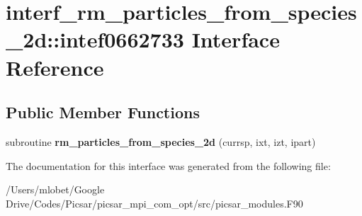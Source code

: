 \hypertarget{interfaceinterf__rm__particles__from__species__2d_1_1intef0662733}{}\section{interf\+\_\+rm\+\_\+particles\+\_\+from\+\_\+species\+\_\+2d\+:\+:intef0662733 Interface Reference}
\label{interfaceinterf__rm__particles__from__species__2d_1_1intef0662733}
\subsection*{Public Member Functions}
\begin{DoxyCompactItemize}
\item 
subroutine {\bfseries rm\+\_\+particles\+\_\+from\+\_\+species\+\_\+2d} (currsp, ixt, izt, ipart)\hypertarget{interfaceinterf__rm__particles__from__species__2d_1_1intef0662733_a2238c25c823ff2c8c90c3ff171bee287}{}\label{interfaceinterf__rm__particles__from__species__2d_1_1intef0662733_a2238c25c823ff2c8c90c3ff171bee287}

\end{DoxyCompactItemize}


The documentation for this interface was generated from the following file\+:\begin{DoxyCompactItemize}
\item 
/\+Users/mlobet/\+Google Drive/\+Codes/\+Picsar/picsar\+\_\+mpi\+\_\+com\+\_\+opt/src/picsar\+\_\+modules.\+F90\end{DoxyCompactItemize}
